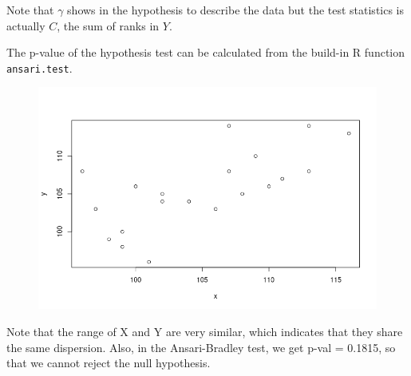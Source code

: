 Note that $\gamma$ shows in the hypothesis to describe the data but the test statistics is actually $C$, the sum of ranks in $Y$.

The p-value of the hypothesis test can be calculated from the build-in R function \texttt{ansari.test}.

\begin{center}
	
\end{center}

\begin{figure}[H]
	\centering
	\includegraphics[width=0.7\linewidth]{fig/ansari}
	\caption{}
	\label{fig:ansari}
\end{figure}

Note that the range of X and Y are very similar, which indicates that they share the same dispersion. Also, in the Ansari-Bradley test, we get p-val = 0.1815, so that we cannot reject the null hypothesis.

